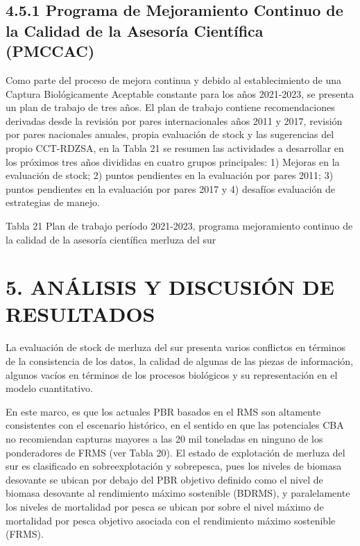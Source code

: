 \documentclass[
  spanish,
]{article}
\begin{document}
\hypertarget{programa-de-mejoramiento-continuo-de-la-calidad-de-la-asesoruxeda-cientuxedfica-pmccac}{%
\subsection{4.5.1 Programa de Mejoramiento Continuo de la Calidad de la
Asesoría Científica
(PMCCAC)}\label{programa-de-mejoramiento-continuo-de-la-calidad-de-la-asesoruxeda-cientuxedfica-pmccac}}

Como parte del proceso de mejora continua y debido al establecimiento de
una Captura Biológicamente Aceptable constante para los años 2021-2023,
se presenta un plan de trabajo de tres años. El plan de trabajo contiene
recomendaciones derivadas desde la revisión por pares internacionales
años 2011 y 2017, revisión por pares nacionales anuales, propia
evaluación de stock y las sugerencias del propio CCT-RDZSA, en la Tabla
21 se resumen las actividades a desarrollar en los próximos tres años
divididas en cuatro grupos principales: 1) Mejoras en la evaluación de
stock; 2) puntos pendientes en la evaluación por pares 2011; 3) puntos
pendientes en la evaluación por pares 2017 y 4) desafíos evaluación de
estrategias de manejo.

Tabla 21 Plan de trabajo período 2021-2023, programa mejoramiento
continuo de la calidad de la asesoría científica merluza del sur

\pagebreak

\hypertarget{anuxe1lisis-y-discusiuxf3n-de-resultados}{%
\section{5. ANÁLISIS Y DISCUSIÓN DE
RESULTADOS}\label{anuxe1lisis-y-discusiuxf3n-de-resultados}}

La evaluación de stock de merluza del sur presenta varios conflictos en
términos de la consistencia de los datos, la calidad de algunas de las
piezas de información, algunos vacíos en términos de los procesos
biológicos y su representación en el modelo cuantitativo.

En este marco, es que los actuales PBR basados en el RMS son altamente
consistentes con el escenario histórico, en el sentido en que las
potenciales CBA no recomiendan capturas mayores a las 20 mil toneladas
en ninguno de los ponderadores de FRMS (ver Tabla 20). El estado de
explotación de merluza del sur es clasificado en sobreexplotación y
sobrepesca, pues los niveles de biomasa desovante se ubican por debajo
del PBR objetivo definido como el nivel de biomasa desovante al
rendimiento máximo sostenible (BDRMS), y paralelamente los niveles de
mortalidad por pesca se ubican por sobre el nivel máximo de mortalidad
por pesca objetivo asociada con el rendimiento máximo sostenible (FRMS).
\end{document}
